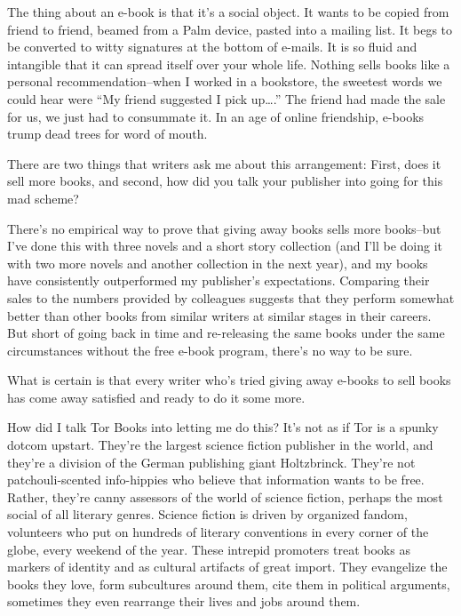 The thing about an e-book is that it's a social object. It wants to
be copied from friend to friend, beamed from a Palm device, pasted
into a mailing list. It begs to be converted to witty signatures at
the bottom of e-mails. It is so fluid and intangible that it can
spread itself over your whole life. Nothing sells books like a
personal recommendation--when I worked in a bookstore, the sweetest
words we could hear were ``My friend suggested I pick up\ldots{}.'' The
friend had made the sale for us, we just had to consummate it. In
an age of online friendship, e-books trump dead trees for word of
mouth.

There are two things that writers ask me about this arrangement:
First, does it sell more books, and second, how did you talk your
publisher into going for this mad scheme?

There's no empirical way to prove that giving away books sells more
books--but I've done this with three novels and a short story
collection (and I'll be doing it with two more novels and another
collection in the next year), and my books have consistently
outperformed my publisher's expectations. Comparing their sales to
the numbers provided by colleagues suggests that they perform
somewhat better than other books from similar writers at similar
stages in their careers. But short of going back in time and
re-releasing the same books under the same circumstances without
the free e-book program, there's no way to be sure.

What is certain is that every writer who's tried giving away
e-books to sell books has come away satisfied and ready to do it
some more.

How did I talk Tor Books into letting me do this? It's not as if
Tor is a spunky dotcom upstart. They're the largest science fiction
publisher in the world, and they're a division of the German
publishing giant Holtzbrinck. They're not patchouli-scented
info-hippies who believe that information wants to be free. Rather,
they're canny assessors of the world of science fiction, perhaps
the most social of all literary genres. Science fiction is driven
by organized fandom, volunteers who put on hundreds of literary
conventions in every corner of the globe, every weekend of the
year. These intrepid promoters treat books as markers of identity
and as cultural artifacts of great import. They evangelize the
books they love, form subcultures around them, cite them in
political arguments, sometimes they even rearrange their lives and
jobs around them.

